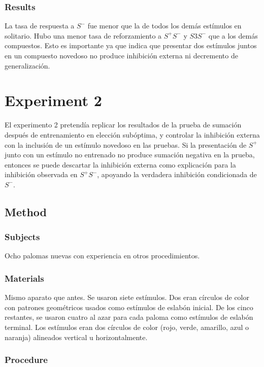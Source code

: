 \documentclass[a4paper,12pt]{article}
\begin{document}
\subsubsection{Results}

La tasa de respuesta a $S^{-}$ fue menor que la de todos los demás estímulos en solitario.
Hubo una menor tasa de reforzamiento a $S^{+}S^{-}$ y $S3S^{-}$ que a los demás compuestos.
Esto es importante ya que indica que presentar dos estímulos juntos en un compuesto novedoso no produce inhibición externa ni decremento de generalización.

\section{Experiment 2}

El experimento 2 pretendía replicar los resultados de la prueba de sumación después de entrenamiento en elección subóptima, y controlar la inhibición externa con la inclusión de un estímulo novedoso en las pruebas.
Si la presentación de $S^{+}$ junto con un estímulo no entrenado no produce sumación negativa en la prueba, entonces se puede descartar la inhibición externa como explicación para la inhibición observada en $S^{+}S^{-}$, apoyando la verdadera inhibición condicionada de $S^{-}$.

\subsection{Method}

\subsubsection{Subjects}

Ocho palomas nuevas con experiencia en otros procedimientos.

\subsubsection{Materials}

Mismo aparato que antes.
Se usaron siete estímulos. Dos eran círculos de color con patrones geométricos usados como estímulos de eslabón  inicial.
De los cinco restantes, se usaron cuatro al azar para cada paloma como estímulos de eslabón terminal.
Los estímulos eran dos círculos de color (rojo, verde, amarillo, azul o naranja) alineados vertical u horizontalmente.

\subsubsection{Procedure}
\end{document}
